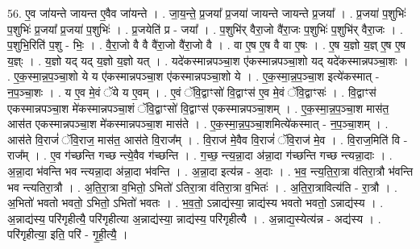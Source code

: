\documentclass[17pt]{extarticle}
\begin{document}
56. ए॒व जा॑यन्ते जायन्त ए॒वैव जा॑यन्ते । . जा॒य॒न्ते॒ प्र॒जया᳚ प्र॒जया॑ जायन्ते जायन्ते प्र॒जया᳚ । . प्र॒जया॑ प॒शुभिः॑ प॒शुभिः॑ प्र॒जया᳚ प्र॒जया॑ प॒शुभिः॑ । . प्र॒जयेति॑ प्र - जया᳚ । . प॒शुभि॑र् वैरा॒जो वै॑रा॒जः प॒शुभिः॑ प॒शुभि॑र् वैरा॒जः । . प॒शुभि॒रिति॑ प॒शु - भिः॒ । . वै॒रा॒जो वै वै वै॑रा॒जो वै॑रा॒जो वै । . वा ए॒ष ए॒ष वै वा ए॒षः । . ए॒ष य॒ज्ञो य॒ज्ञ् ए॒ष ए॒ष य॒ज्ञ्ः । . य॒ज्ञो यद् यद् य॒ज्ञो य॒ज्ञो यत् । . यदे॑कस्मान्नपञ्चा॒श ए॑कस्मान्नपञ्चा॒शो यद् यदे॑कस्मान्नपञ्चा॒शः । . ए॒क॒स्मा॒न्न॒प॒ञ्चा॒शो ये य ए॑कस्मान्नपञ्चा॒श ए॑कस्मान्नपञ्चा॒शो ये । . ए॒क॒स्मा॒न्न॒प॒ञ्चा॒श इत्ये॑कस्मात् - न॒प॒ञ्चा॒शः । . य ए॒व मे॒वं ॅये य ए॒वम् । . ए॒वं ॅवि॒द्वाꣳसो॑ वि॒द्वाꣳस॑ ए॒व मे॒वं ॅवि॒द्वाꣳसः॑ । . वि॒द्वाꣳस॑ एकस्मान्नपञ्चा॒श मे॑कस्मान्नपञ्चा॒शं ॅवि॒द्वाꣳसो॑ वि॒द्वाꣳस॑ एकस्मान्नपञ्चा॒शम् । . ए॒क॒स्मा॒न्न॒प॒ञ्चा॒श मास॑त॒ आस॑त एकस्मान्नपञ्चा॒श मे॑कस्मान्नपञ्चा॒श मास॑ते । . ए॒क॒स्मा॒न्न॒प॒ञ्चा॒शमित्ये॑कस्मात् - न॒प॒ञ्चा॒शम् । . आस॑ते वि॒राजं॑ ॅवि॒राज॒ मास॑त॒ आस॑ते वि॒राज᳚म् । . वि॒राज॑ मे॒वैव वि॒राजं॑ ॅवि॒राज॑ मे॒व । . वि॒राज॒मिति॑ वि - राज᳚म् । . ए॒व ग॑च्छन्ति गच्छ न्त्ये॒वैव ग॑च्छन्ति । . ग॒च्छ॒ न्त्य॒न्ना॒दा अ॑न्ना॒दा ग॑च्छन्ति गच्छ न्त्यन्ना॒दाः । . अ॒न्ना॒दा भ॑वन्ति भव न्त्यन्ना॒दा अ॑न्ना॒दा भ॑वन्ति । . अ॒न्ना॒दा इत्य॑न्न - अ॒दाः । . भ॒व॒ न्त्य॒ति॒रा॒त्रा व॑तिरा॒त्रौ भ॑वन्ति भव न्त्यतिरा॒त्रौ । . अ॒ति॒रा॒त्रा व॒भितो॒ ऽभितो॑ ऽतिरा॒त्रा व॑तिरा॒त्रा व॒भितः॑ । . अ॒ति॒रा॒त्रावित्य॑ति - रा॒त्रौ । . अ॒भितो॑ भवतो भवतो॒ ऽभितो॒ ऽभितो॑ भवतः । . भ॒व॒तो॒ ऽन्नाद्य॑स्या॒ न्नाद्य॑स्य भवतो भवतो॒ ऽन्नाद्य॑स्य । . अ॒न्नाद्य॑स्य॒ परि॑गृहीत्यै॒ परि॑गृहीत्या अ॒न्नाद्य॑स्या॒ न्नाद्य॑स्य॒ परि॑गृहीत्यै । . अ॒न्नाद्य॒स्येत्य॑न्न - अद्य॑स्य । . परि॑गृहीत्या॒ इति॒ परि॑ - गृ॒ही॒त्यै॒ । \newline
\end{document}
